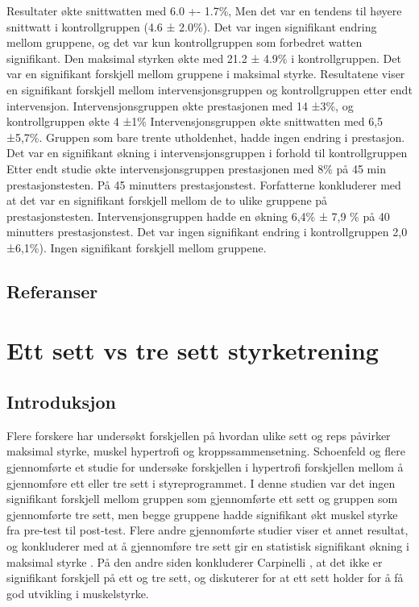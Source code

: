 \documentclass[
]{book}
\begin{document}
Resultater \citep{rønnestad2010b} økte snittwatten med 6.0 +- 1.7\%, Men det var en tendens til høyere snittwatt i kontrollgruppen (4.6 ± 2.0\%). Det var ingen signifikant endring mellom gruppene, og det var kun kontrollgruppen som forbedret watten signifikant. Den maksimal styrken økte med 21.2 ± 4.9\% i kontrollgruppen. Det var en signifikant forskjell mellom gruppene i maksimal styrke. \citet{rønnestad2010a} Resultatene viser en signifikant forskjell mellom intervensjonsgruppen og kontrollgruppen etter endt intervensjon. Intervensjonsgruppen økte prestasjonen med 14 ±3\%, og kontrollgruppen økte 4 ±1\% \citet{rønnestad2015} Intervensjonsgruppen økte snittwatten med 6,5 ±5,7\%. Gruppen som bare trente utholdenhet, hadde ingen endring i prestasjon. Det var en signifikant økning i intervensjonsgruppen i forhold til kontrollgruppen \citet{aagaard2011} Etter endt studie økte intervensjonsgruppen prestasjonen med 8\% på 45 min prestasjonstesten. På 45 minutters prestasjonstest. Forfatterne konkluderer med at det var en signifikant forskjell mellom de to ulike gruppene på prestasjonstesten. \citet{vikmoen2016} Intervensjonsgruppen hadde en økning 6,4\% ± 7,9 \% på 40 minutters prestasjonstest. Det var ingen signifikant endring i kontrollgruppen 2,0 ±6,1\%). Ingen signifikant forskjell mellom gruppene.

\hypertarget{referanser-2}{%
\section{Referanser}\label{referanser-2}}

\hypertarget{ett-sett-vs-tre-sett-styrketrening}{%
\chapter{Ett sett vs tre sett styrketrening}\label{ett-sett-vs-tre-sett-styrketrening}}

\hypertarget{introduksjon-1}{%
\section{Introduksjon}\label{introduksjon-1}}

Flere forskere har undersøkt forskjellen på hvordan ulike sett og reps påvirker maksimal styrke, muskel hypertrofi og kroppssammensetning. Schoenfeld og flere \citep{2019} gjennomførte et studie for undersøke forskjellen i hypertrofi forskjellen mellom å gjennomføre ett eller tre sett i styreprogrammet. I denne studien var det ingen signifikant forskjell mellom gruppen som gjennomførte ett sett og gruppen som gjennomførte tre sett, men begge gruppene hadde signifikant økt muskel styrke fra pre-test til post-test. Flere andre gjennomførte studier viser et annet resultat, og konkluderer med at å gjennomføre tre sett gir en statistisk signifikant økning i maksimal styrke \citep{rhea2002, munn2005, fröhlich2010}. På den andre siden konkluderer Carpinelli \citep{carpinelli1998}, at det ikke er signifikant forskjell på ett og tre sett, og diskuterer for at ett sett holder for å få god utvikling i muskelstyrke.
\end{document}
